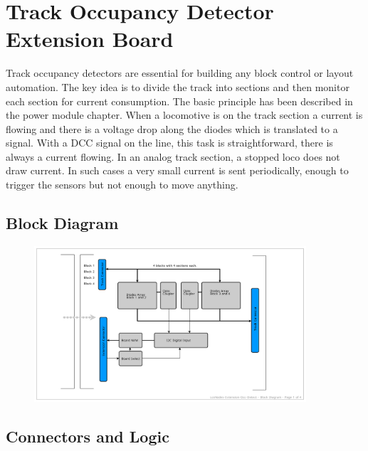 \chapter{Track Occupancy Detector Extension Board}

Track occupancy detectors are essential for building any block control or layout automation. The key idea is to divide the track into sections and then monitor each section for current consumption. The basic principle has been described in the power module chapter. When a locomotive is on the track section a current is flowing and there is a voltage drop along the diodes which is translated to a signal. With a DCC signal on the line, this task is straightforward, there is always a current flowing. In an analog track section, a stopped loco does not draw current. In such cases a very small current is sent periodically, enough to trigger the sensors but not enough to move anything.

\section{Block Diagram}

\begin{figure}[htbp]
    \centering
    \includegraphics[page=1, width=0.9\textwidth]{./Schematics/Schematic_LcsNodes-Extension-4x4-Occ-Detect.pdf}
\end{figure}
\FloatBarrier

\section{Connectors and Logic}

